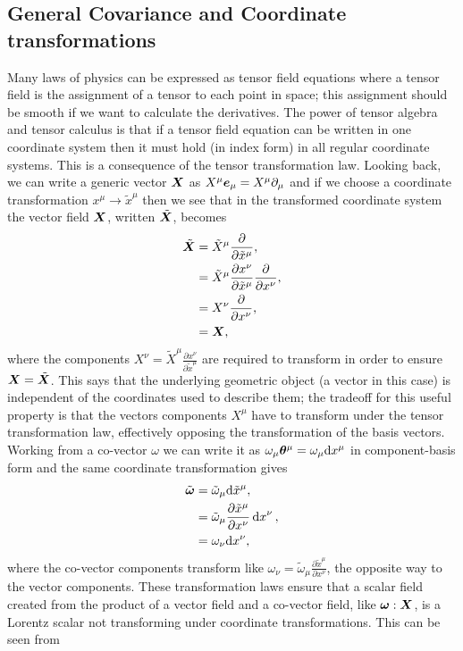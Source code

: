 \subsection{General Covariance and Coordinate transformations}\label{intro:sec:cov}
Many laws of physics can be expressed as tensor field equations where a tensor
field is the assignment of a tensor to each point in space;
\color{orchid} this assignment should be smooth if we want to calculate the derivatives. \color{black}
The power of tensor algebra and tensor calculus is that if a tensor field equation
can be written in one coordinate system then  it must hold (in index form) in all
regular coordinate systems. This is a consequence of the tensor transformation law.
Looking back, we can write a generic vector
$\boldsymbol{X}$ as $X^\mu \boldsymbol{e}_\mu = X^\mu \partial_\mu$ and if we choose a coordinate
transformation $x^\mu \rightarrow \tilde{x}^\mu$ then we see that in the transformed
coordinate system the vector field $\boldsymbol{X}$, written $\tilde{\boldsymbol{X}}$, becomes
\begin{align}
\tilde{\boldsymbol X} &= \tilde{X}^\mu\frac{\partial}{\partial \tilde{x}^\mu}, \\
              &= \tilde{X}^\mu\frac{\partial x^\nu}{\partial \tilde{x}^\mu}\frac{\partial}{\partial {x}^\nu}, \\
              &= X^\nu \frac{\partial}{\partial x^\nu}, \\
              &= \boldsymbol{X}, \
\end{align}
where the components $X^\nu = \tilde{X}^\mu\frac{\partial x^\nu}{\partial \tilde{x}^\mu}$ are required to transform in order to ensure $\boldsymbol{X}=\tilde{\boldsymbol{X}}$. This says that the underlying geometric object (a vector in this case) is independent of the coordinates used to describe them; the tradeoff for this useful property is that the vectors components $X^\mu$ have to transform under the tensor transformation law, effectively opposing the transformation of the basis vectors. Working from a co-vector $\omega$ we can write it as $\omega_\mu \boldsymbol{\theta}^\mu = \omega_\mu \dd x^\mu$ in component-basis form and the same coordinate transformation gives
\begin{align}
\tilde{\boldsymbol{\omega}} &= \tilde{\omega}_\mu \dd \tilde{x}^\mu , \\
                    &= \tilde{\omega}_\mu \frac{\partial \tilde{x}^\mu}{\partial x^\nu}\dd {x}^\nu , \\
                    &= \omega_\nu \dd x^\nu,
\end{align}
where the co-vector components transform like $\omega_\nu= \tilde{\omega}_\mu \frac{\partial \tilde{x}^\mu}{\partial x^\nu}$, the opposite way to the vector components. These transformation laws ensure that a scalar field created from the product of a vector field and a co-vector field, like $\boldsymbol{\omega}: \boldsymbol{X}$, is a Lorentz scalar not transforming under coordinate transformations. This can be seen from
